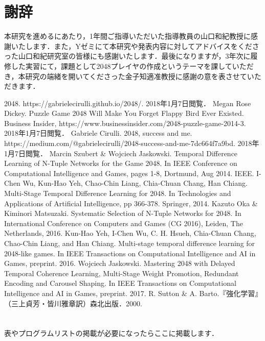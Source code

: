\documentclass{suribt}
\begin{document}
\backmatter
\chapter{謝辞}
本研究を進めるにあたり，1年間ご指導いただいた指導教員の山口和紀教授に感謝いたします．また，Yゼミにて本研究や発表内容に対してアドバイスをくださった山口和紀研究室の皆様にも感謝いたします．最後になりますが，3年次に履修した実習にて，課題として2048プレイヤの作成というテーマを課していただき，本研究の端緒を開いてくださった金子知適准教授に感謝の意を表させていただきます．

\begin{thebibliography}{}
  2048. https://gabrielecirulli.github.io/2048/. 2018年1月7日閲覧．
  Megan Rose Dickey. Puzzle Game 2048 Will Make You Forget Flappy Bird Ever Existed. Business Insider, https://www.businessinsider.com/2048-puzzle-game-2014-3. 2018年1月7日閲覧．
  Gabriele Cirulli. 2048, success and me. https://medium.com/@gabrielecirulli/2048-success-and-me-7dc664f7a9bd. 2018年1月7日閲覧．
  Marcin Szubert \& Wojciech Jaskowski. Temporal Difference Learning of N-Tuple Networks for the Game 2048. In IEEE Conference on Computational Intelligence and Games, pages 1-8, Dortmund, Aug 2014. IEEE.
  I-Chen Wu, Kun-Hao Yeh, Chao-Chin Liang, Chia-Chuan Chang, Han Chiang. Multi-Stage Temporal Difference Learning for 2048. In Technologies and Applications of Artificial Intelligence, pp 366-378. Springer, 2014.
  Kazuto Oka \& Kiminori Matsuzaki. Systematic Selection of N-Tuple Networks for 2048. In International Conference on Computers and Games (CG 2016), Leiden, The Netherlands, 2016.
  Kun-Hao Yeh, I-Chen Wu, C. H. Hsueh, Chia-Chuan Chang, Chao-Chin Liang, and Han Chiang. Multi-stage temporal difference learning for 2048-like games. In IEEE Transactions on Computational Intelligence and AI in Games, preprint. 2016.
  Wojciech Jaskowski. Mastering 2048 with Delayed Temporal Coherence Learning, Multi-Stage Weight Promotion, Redundant Encoding and Carousel Shaping. In IEEE Transactions on Computational Intelligence and AI in Games, preprint. 2017.
  R. Sutton \& A. Barto.『強化学習』（三上貞芳・皆川雅章訳）森北出版．2000.
\end{thebibliography}

\appendix
\chapter{}
表やプログラムリストの掲載が必要になったらここに掲載します．
\end{document}
